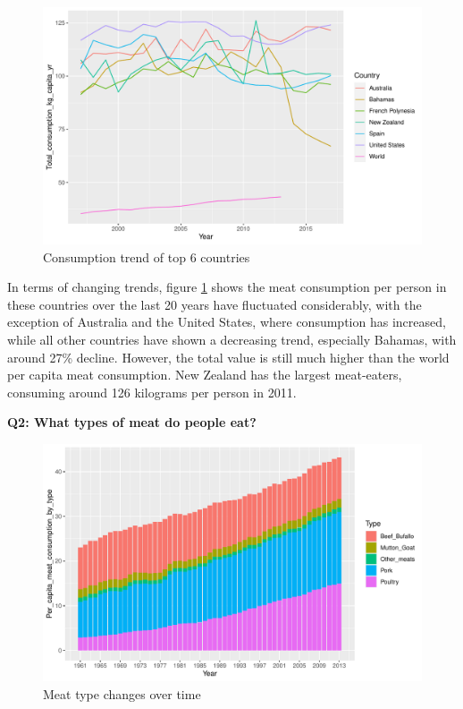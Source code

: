 \documentclass[11pt,a4paper,]{article}
\begin{document}
\begin{figure}
\centering
\includegraphics{report_files/figure-latex/highest-consumption-trend-1.pdf}
\caption{\label{fig:highest-consumption-trend}Consumption trend of top 6 countries}
\end{figure}

In terms of changing trends, figure \ref{fig:highest-consumption-trend} shows the meat consumption per person in these countries over the last 20 years have fluctuated considerably, with the exception of Australia and the United States, where consumption has increased, while all other countries have shown a decreasing trend, especially Bahamas, with around 27\% decline. However, the total value is still much higher than the world per capita meat consumption. New Zealand has the largest meat-eaters, consuming around 126 kilograms per person in 2011.

\clearpage

\textbf{Q2: What types of meat do people eat?}

\begin{figure}
\centering
\includegraphics{report_files/figure-latex/Meat-type-1.pdf}
\caption{\label{fig:Meat-type}Meat type changes over time}
\end{figure}
\end{document}
